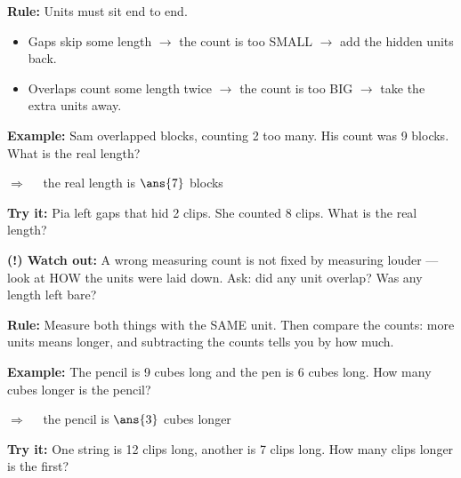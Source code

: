 \documentclass[12pt]{article}
\begin{document}


\begin{formulabox}
\textbf{Rule:} Units must sit end to end.\par
\begin{itemize}[leftmargin=1.2cm, itemsep=1pt, topsep=2pt]
  \item Gaps skip some length $\to$ the count is too SMALL $\to$ add the
    hidden units back.
  \item Overlaps count some length twice $\to$ the count is too BIG $\to$
    take the extra units away.
\end{itemize}
\end{formulabox}

\begin{examplebox}
\textbf{Example:} \quad Sam overlapped blocks, counting 2 too many. His count
was 9 blocks. What is the real length?

$\Rightarrow\quad$ the real length is $\ans{7}$ blocks
\end{examplebox}

\begin{tryitbox}
\textbf{Try it:} \quad Pia left gaps that hid 2 clips. She counted 8 clips.
What is the real length?\\[2pt]
\end{tryitbox}

\begin{watchoutbox}
\textbf{(!) Watch out:} A wrong measuring count is not fixed by measuring
louder --- look at HOW the units were laid down. Ask: did any unit overlap?
Was any length left bare?
\end{watchoutbox}


\begin{formulabox}
\textbf{Rule:} Measure both things with the SAME unit. Then compare the
counts: more units means longer, and subtracting the counts tells you by how
much.
\end{formulabox}

\begin{examplebox}
\textbf{Example:} \quad The pencil is 9 cubes long and the pen is 6 cubes
long. How many cubes longer is the pencil?

$\Rightarrow\quad$ the pencil is $\ans{3}$ cubes longer
\end{examplebox}

\begin{tryitbox}
\textbf{Try it:} \quad One string is 12 clips long, another is 7 clips long.
How many clips longer is the first?\\[2pt]
\end{tryitbox}
\end{document}
